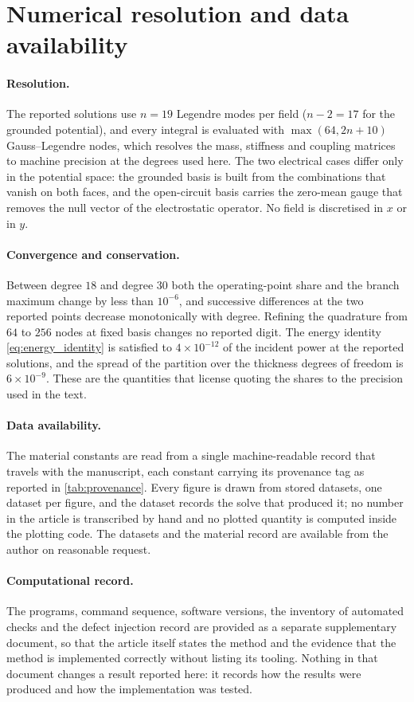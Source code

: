 \section{Numerical resolution and data availability}
\label{app:repro}

\paragraph{Resolution.}  The reported solutions use $n=19$ Legendre modes per
field ($n-2=17$ for the grounded potential), and every integral is evaluated
with $\max(64,2n+10)$ Gauss--Legendre nodes, which resolves the mass, stiffness
and coupling matrices to machine precision at the degrees used here.  The two
electrical cases differ only in the potential space: the grounded basis is built
from the combinations that vanish on both faces, and the open-circuit basis
carries the zero-mean gauge that removes the null vector of the electrostatic
operator.  No field is discretised in $x$ or in $y$.

\paragraph{Convergence and conservation.}  Between degree $18$ and degree $30$
both the operating-point share and the branch maximum change by less than
$10^{-6}$, and successive differences at the two reported points decrease
monotonically with degree.  Refining the quadrature from $64$ to $256$ nodes at
fixed basis changes no reported digit.  The energy identity
\eqref{eq:energy_identity} is satisfied to $4\times10^{-12}$ of the incident
power at the reported solutions, and the spread of the partition over the
thickness degrees of freedom is $6\times10^{-9}$.  These are the quantities that
license quoting the shares to the precision used in the text.

\paragraph{Data availability.}  The material constants are read from a single
machine-readable record that travels with the manuscript, each constant carrying
its provenance tag as reported in \cref{tab:provenance}.  Every figure is drawn
from stored datasets, one dataset per figure, and the dataset records the solve
that produced it; no number in the article is transcribed by hand and no plotted
quantity is computed inside the plotting code.  The datasets and the material
record are available from the author on reasonable request.

\paragraph{Computational record.}  \label{app:checks} The programs, command
sequence, software versions, the inventory of automated checks and the defect
injection record are provided as a separate supplementary document, so that the
article itself states the method and the evidence that the method is
implemented correctly without listing its tooling.  Nothing in that document
changes a result reported here: it records how the results were produced and how
the implementation was tested.
